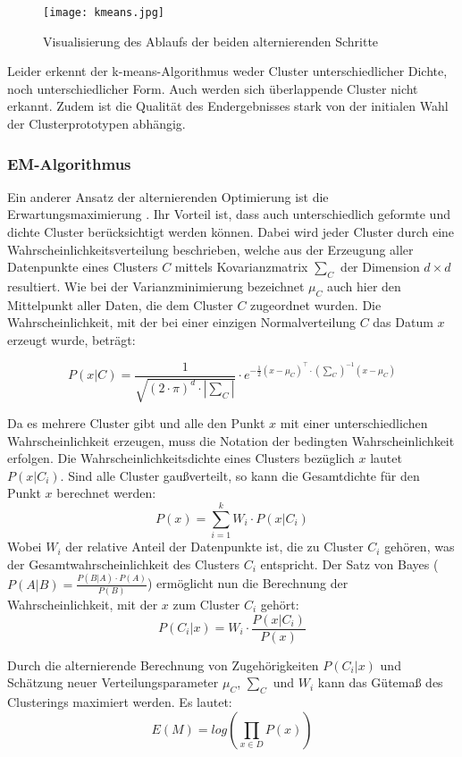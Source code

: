 \documentclass[11pt,ceqn]{book}
\begin{document}
\begin{figure}[H]
\centering
\texttt{[image: kmeans.jpg]}
\caption{Visualisierung des Ablaufs der beiden alternierenden Schritte}\label{cluster}
\end{figure}

Leider erkennt der k-means-Algorithmus weder Cluster unterschiedlicher Dichte, noch unterschiedlicher Form. Auch werden sich überlappende Cluster nicht erkannt. Zudem ist die Qualität des Endergebnisses stark von der initialen Wahl der Clusterprototypen abhängig.

\subsubsection{EM-Algorithmus}
Ein anderer Ansatz der alternierenden Optimierung ist die Erwartungsmaximierung \cite{emalg}. Ihr Vorteil ist, dass auch unterschiedlich geformte und dichte Cluster berücksichtigt werden können. Dabei wird jeder Cluster durch eine Wahrscheinlichkeitsverteilung beschrieben, welche aus der Erzeugung aller Datenpunkte eines Clusters $C$ mittels Kovarianzmatrix $\sum_C$ der Dimension $d \times d$ resultiert. Wie bei der Varianzminimierung bezeichnet $\mu_C$ auch hier den Mittelpunkt aller Daten, die dem Cluster $C$ zugeordnet wurden. Die Wahrscheinlichkeit, mit der bei einer einzigen Normalverteilung $C$ das Datum $x$ erzeugt wurde, beträgt:

$$P(x|C) = \frac{1}{\sqrt{(2\cdot \pi)^d \cdot |\sum_C|}} \cdot e^{-\frac{1}{2}(x - \mu_C)^{\top} \cdot \left(\sum_C\right)^{-1}(x - \mu_C)}$$ 

Da es mehrere Cluster gibt und alle den Punkt $x$ mit einer unterschiedlichen Wahrscheinlichkeit erzeugen, muss die Notation der bedingten Wahrscheinlichkeit erfolgen. Die Wahrscheinlichkeitsdichte eines Clusters bezüglich $x$ lautet $P(x|C_i)$. Sind alle Cluster gaußverteilt, so kann die Gesamtdichte für den Punkt $x$ berechnet werden: $$P(x) = \sum_{i=1}^k W_i \cdot P(x|C_i)$$ 
Wobei $W_i$ der relative Anteil der Datenpunkte ist, die zu Cluster $C_i$ gehören, was der Gesamtwahrscheinlichkeit des Clusters $C_i$ entspricht. Der Satz von Bayes ($P(A|B) = \frac{P(B|A)\cdot P(A)}{P(B)}$) ermöglicht nun die Berechnung der Wahrscheinlichkeit, mit der $x$ zum Cluster $C_i$ gehört:
$$P(C_i|x) = W_i \cdot \frac{P(x|C_i)}{P(x)}$$

Durch die alternierende Berechnung von Zugehörigkeiten $P(C_i|x)$ und Schätzung neuer Verteilungsparameter $\mu_C$, $\sum_C$ und $W_i$ kann das Gütemaß des Clusterings maximiert werden. Es lautet:
$$E(M) = log\left(\prod_{x \in D} P(x)\right)$$
\end{document}

